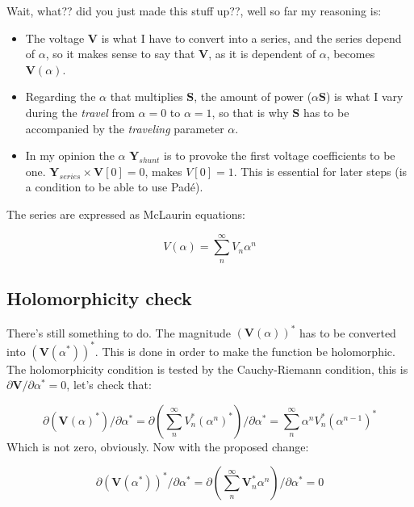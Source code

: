 \documentclass[nols,a4paper,twoside,notoc,fleqn]{tufte-book}
\begin{document}
Wait, what?? did you just made this stuff up??, well so far my reasoning is:
\begin{itemize}
	\item The voltage $\textbf{V}$ is what I have to convert into a series, and the series depend of $\alpha$, so it makes sense to say that $\textbf{V}$, as it is dependent of $\alpha$, becomes $\textbf{V}(\alpha)$.
	
	\item Regarding the $\alpha$ that multiplies $\textbf{S}$, the amount of power ($\alpha \textbf{S}$) is what I vary during the \textit{travel} from $\alpha=0$ to $\alpha=1$, so that is why $\textbf{S}$ has to be accompanied by the \textit{traveling} parameter $\alpha.$
	
	\item In my opinion the $\alpha$ $\textbf{Y}_{shunt}$ is to provoke the first voltage coefficients to be one.  $\textbf{Y}_{series} \times \textbf{V}[0] = 0$, makes $V[0]=1$. This is essential for later steps (is a condition to be able to use Pad\'e). \newline
\end{itemize}

The series are expressed as McLaurin equations:

\begin{equation}
V(\alpha) = \sum_{n}^{\infty} V_n \alpha ^n
\label{eq:McLaurinV}
\end{equation}

\subsection{Holomorphicity check}
	
	There's still something to do. The magnitude $\left(\textbf{V}( \alpha )\right)^*$ has to be converted into $\left(\textbf{V}( \alpha^* )\right)^*$. This is done in order to make the function be holomorphic. The holomorphicity condition is tested by the Cauchy-Riemann condition, this is $\partial \textbf{V} / \partial \alpha^* = 0$, let's check that:
	
	\begin{equation}
	\partial \left(\textbf{V}( \alpha )^*\right) / \partial \alpha^*  = \partial \left(\sum_{n}^{\infty} V_n^* (\alpha ^n)^*\right) / \partial \alpha^*  = \sum_{n}^{\infty} \alpha ^n V_n^* (\alpha ^{n-1})^*
	\end{equation} 
	Which is not zero, obviously. Now with the proposed change:
	
	\begin{equation}
	\partial \left( \textbf{V}( \alpha^* )\right)^* / \partial \alpha^*  = \partial \left(\sum_{n}^{\infty} \textbf{V}_n^* \alpha ^n \right) / \partial \alpha^*  = 0
	\end{equation} 
	
\end{document}

